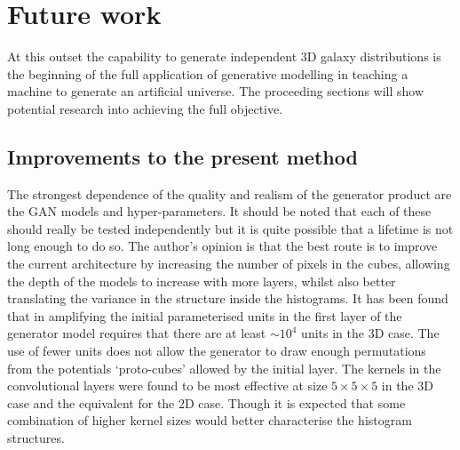 \documentclass[twocolumn]{article}
\numberwithin{equation}{section}
\begin{document}


\section{Future work}\label{sec:future_work}
At this outset the capability to generate independent 3D galaxy distributions is the beginning of the full application of 
generative modelling in teaching a machine to generate an artificial universe. The proceeding sections will show potential 
research into achieving the full objective.


\subsection{Improvements to the present method}
The strongest dependence of the quality and realism of the generator product are the GAN models and hyper-parameters. It 
should be noted that each of these should really be tested independently but it is quite possible that a lifetime is not 
long enough to do so. The author's opinion is that the best route is to improve the current architecture by increasing the 
number of pixels in the cubes, allowing the depth of the models to increase with more layers, whilst also better translating
the variance in the structure inside the histograms. It has been found that in amplifying the initial parameterised units 
in the first layer of the generator model requires that there are at least $\sim \! 10^4$ units in the 3D case. The use of
fewer units does not allow the generator to draw enough permutations from the potentials  `proto-cubes' allowed by the 
initial layer. The kernels in the convolutional layers were found to be most effective at size $5 \times 5 \times 5$ in 
the 3D case and the equivalent for the 2D case. Though it is expected that some combination of higher kernel sizes would 
better characterise the histogram structures. 
\end{document}

